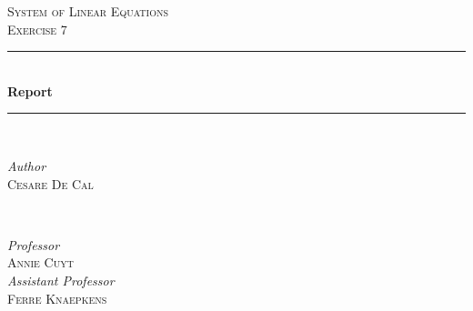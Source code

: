 \documentclass{article}
\begin{document}

\begin{titlepage} %
	\newcommand{\HRule}{\rule{\linewidth}{0.5mm}}%
	
	\center %
	
	
	\textsc{\Large System of Linear Equations}\\[0.5cm] %
	
	\textsc{\large Exercise 7}\\[0.5cm] %
	
	
	\HRule\\[0.6cm]
	
	{\huge\bfseries Report}\\[0.25cm] %
	
	\HRule\\[1.5cm]
	
	
	\begin{minipage}{0.4\textwidth}
		\begin{flushleft}
			\large
			\textit{Author}\\
			\textsc{Cesare De Cal} %
		\end{flushleft}
	\end{minipage}
	~
	\begin{minipage}{0.4\textwidth}
		\begin{flushright}
			\large
			\textit{Professor}\\
			\textsc{Annie Cuyt}\\ %
			[0.25cm]
			\textit{Assistant Professor}\\
			\textsc{Ferre Knaepkens} %

		\end{flushright}
	\end{minipage}
	

\end{titlepage}
\end{document}
